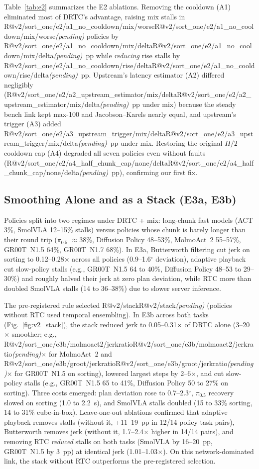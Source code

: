 \documentclass[conference]{IEEEtran}
\makeatletter
\newcommand{\R}[1]{\ifcsname R@#1\endcsname\csname R@#1\endcsname\else\textit{(pending)}\fi}
\newcommand{\drtc}{DRTC}
\newcommand{\smolvla}{SmolVLA}
\newcommand{\groot}{GR00T~N1.5}
\newcommand{\pizerofive}{$\pi_{0.5}$}
\makeatother
\begin{document}
Table~\ref{tab:e2} summarizes the E2 ablations. Removing the cooldown (A1) eliminated most of \drtc's advantage, raising mix stalls in \R{v2/sort_one/e2/a1_no_cooldown/mix/worse} policies by \R{v2/sort_one/e2/a1_no_cooldown/mix/delta}~pp while \emph{reducing} rise stalls by \R{v2/sort_one/e2/a1_no_cooldown/rise/delta}~pp. Upstream's latency estimator (A2) differed negligibly (\R{v2/sort_one/e2/a2_upstream_estimator/mix/delta}~pp under mix) because the steady bench link kept max-100 and Jacobson--Karels nearly equal, and upstream's trigger (A3) added \R{v2/sort_one/e2/a3_upstream_trigger/mix/delta}~pp under mix. Restoring the original $H/2$ cooldown cap (A4) degraded all seven policies even without faults (\R{v2/sort_one/e2/a4_half_chunk_cap/none/delta}~pp), confirming our first fix.

\subsection{Smoothing Alone and as a Stack (E3a, E3b)}

Policies split into two regimes under \drtc{} + mix: long-chunk fast models (ACT 3\%, \smolvla{} 12--15\% stalls) versus policies whose chunk is barely longer than their round trip (\pizerofive{} $\approx$38\%, Diffusion Policy 48--53\%, MolmoAct~2 55--57\%, \groot{} 64\%, GR00T~N1.7 68\%). In E3a, Butterworth filtering cut jerk on sorting to 0.12--0.28$\times$ across all policies (0.9--1.6$^\circ$ deviation), adaptive playback cut slow-policy stalls (e.g., \groot{} 64 to 40\%, Diffusion Policy 48--53 to 29--30\%) and roughly halved their jerk at zero plan deviation, while RTC more than doubled \smolvla{} stalls (14 to 36--38\%) due to slower server inference.

The pre-registered rule selected \R{v2/stack} (policies without RTC used temporal ensembling). In E3b across both tasks (Fig.~\ref{fig:v2_stack}), the stack reduced jerk to 0.05--0.31$\times$ of \drtc{} alone (3--20$\times$ smoother; e.g., \R{v2/sort_one/e3b/molmoact2/jerkratio}$\times$ for MolmoAct~2 and \R{v2/sort_one/e3b/groot/jerkratio}$\times$ for \groot{} on sorting), lowered largest steps by 2--6$\times$, and cut slow-policy stalls (e.g., \groot{} 65 to 41\%, Diffusion Policy 50 to 27\% on sorting). Three costs emerged: plan deviation rose to 0.7--2.3$^\circ$, \pizerofive{} recovery slowed on sorting (1.0 to 2.2~s), and \smolvla{} stalls doubled (15 to 33\% sorting, 14 to 31\% cube-in-box). Leave-one-out ablations confirmed that adaptive playback removes stalls (without it, +11--19~pp in 12/14 policy-task pairs), Butterworth removes jerk (without it, 1.7--2.4$\times$ higher in 14/14 pairs), and removing RTC \emph{reduced} stalls on both tasks (\smolvla{} by 16--20~pp, \groot{} by 3~pp) at identical jerk (1.01--1.03$\times$). On this network-dominated link, the stack without RTC outperforms the pre-registered selection.
\end{document}
